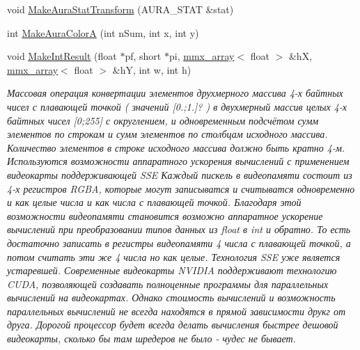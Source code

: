 \begin{DoxyCompactItemize}
\item 
void \hyperlink{class_c_v_i_engine_thread_a83784b07cdfcd4f006fbfa41aacd4d86}{Make\+Aura\+Stat\+Transform} (A\+U\+R\+A\+\_\+\+S\+T\+A\+T \&stat)
\item 
int \hyperlink{class_c_v_i_engine_thread_a5c5e1e4c1a32d38b39af4547ed4b5827}{Make\+Aura\+Color\+A} (int n\+Sum, int x, int y)
\item 
void \hyperlink{class_c_v_i_engine_thread_a77e3066544a8804d4cc5250ac9f4c54b}{Make\+Int\+Result} (float $\ast$pf, short $\ast$pi, \hyperlink{classmmx__array}{mmx\+\_\+array}$<$ float $>$ \&h\+X, \hyperlink{classmmx__array}{mmx\+\_\+array}$<$ float $>$ \&h\+Y, int w, int h)
\begin{DoxyCompactList}\small\item\em Массовая операция конвертации элементов друхмерного массива 4-\/х байтных чисел с плавающей точкой ( значений \mbox{[}0.;1.\mbox{]}? ) в двухмерный массив целых 4-\/х байтных чисел \mbox{[}0;255\mbox{]} с округлением, и одновременным подсчётом сумм элементов по строкам и сумм элементов по столбцам исходного массива. Количество элементов в строке исходного массива должно быть кратно 4-\/м. Используются возможности аппаратного ускорения вычислений с применением видеокарты поддерживающей S\+S\+E Каждый пискель в видеопамяти состоит из 4-\/х регистров R\+G\+B\+A, которые могут записыватся и считыватся одновременно и как целые числа и как числа с плавающей точкой. Благодаря этой возможности видеопамяти становится возможно аппаратное ускорение вычислений при преобразовании типов данных из float в int и обратно. То есть достаточно записать в регистры видеопамяти 4 числа с плавающей точкой, а потом считать эти же 4 числа но как целые. Технология S\+S\+E уже является устаревшей. Современные видеокарты N\+V\+I\+D\+I\+A поддерживают технологию C\+U\+D\+A, позволяющей создавать полноценные программы для параллельных вычислений на видеокартах. Однако стоимость вычислений и возможность параллельных вычислений не всегда находятся в прямой зависимости друкг от друга. Дорогой процессор будет всегда делать вычисления быстрее дешовой видеокарты, сколько бы там шредеров не было -\/ чудес не бывает. \end{DoxyCompactList}\end{DoxyCompactItemize}
